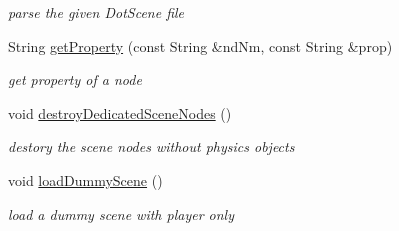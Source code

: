 \begin{DoxyCompactItemize}
\begin{DoxyCompactList}\small\item\em parse the given Dot\+Scene file \end{DoxyCompactList}\item 
String \hyperlink{class_ogre_1_1_dot_scene_loader_ac4d94f0ab478ee808f63e5cf43755cf9}{get\+Property} (const String \&nd\+Nm, const String \&prop)\hypertarget{class_ogre_1_1_dot_scene_loader_ac4d94f0ab478ee808f63e5cf43755cf9}{}\label{class_ogre_1_1_dot_scene_loader_ac4d94f0ab478ee808f63e5cf43755cf9}

\begin{DoxyCompactList}\small\item\em get property of a node \end{DoxyCompactList}\item 
void \hyperlink{class_ogre_1_1_dot_scene_loader_a4e6b3ce29f7cf2a24717290f89c3b834}{destroy\+Dedicated\+Scene\+Nodes} ()\hypertarget{class_ogre_1_1_dot_scene_loader_a4e6b3ce29f7cf2a24717290f89c3b834}{}\label{class_ogre_1_1_dot_scene_loader_a4e6b3ce29f7cf2a24717290f89c3b834}

\begin{DoxyCompactList}\small\item\em destory the scene nodes without physics objects \end{DoxyCompactList}\item 
void \hyperlink{class_ogre_1_1_dot_scene_loader_a52b96034fb06a7e5a93cd22592c16908}{load\+Dummy\+Scene} ()\hypertarget{class_ogre_1_1_dot_scene_loader_a52b96034fb06a7e5a93cd22592c16908}{}\label{class_ogre_1_1_dot_scene_loader_a52b96034fb06a7e5a93cd22592c16908}

\begin{DoxyCompactList}\small\item\em load a dummy scene with player only \end{DoxyCompactList}\end{DoxyCompactItemize}
